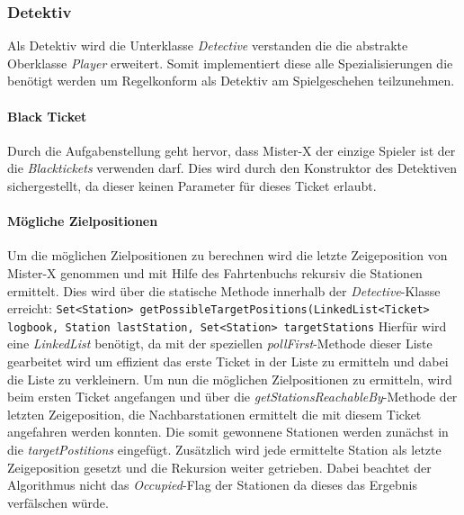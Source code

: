             \subsubsection{Detektiv}

                Als Detektiv wird die Unterklasse \textit{Detective} verstanden die die abstrakte Oberklasse \textit{Player} erweitert.
                Somit implementiert diese alle Spezialisierungen die benötigt werden um Regelkonform als Detektiv am Spielgeschehen teilzunehmen.

                \paragraph{Black Ticket}
                    Durch die Aufgabenstellung geht hervor, dass Mister-X der einzige Spieler ist der die \textit{Blacktickets}
                    verwenden darf. Dies wird durch den Konstruktor des Detektiven sichergestellt, da
                    dieser  keinen Parameter für dieses Ticket erlaubt.

                \paragraph{Mögliche Zielpositionen}
                    Um die möglichen Zielpositionen zu berechnen wird die letzte Zeigeposition von Mister-X genommen
                    und mit Hilfe des Fahrtenbuchs rekursiv die Stationen ermittelt.
                    Dies wird über die statische Methode innerhalb der \textit{Detective}-Klasse erreicht:
                    \newline
                    \newline
                    \texttt{Set<Station> getPossibleTargetPositions(LinkedList<Ticket> logbook,
                    Station lastStation, Set<Station> targetStations}
                    \newline
                    \newline
                    Hierfür wird eine \textit{LinkedList} benötigt, da mit der speziellen \textit{pollFirst}-Methode dieser Liste
                    gearbeitet wird um effizient das erste Ticket in der Liste zu ermitteln und dabei die Liste zu verkleinern.
                    \newline
                    Um nun die möglichen Zielpositionen zu ermitteln, wird beim ersten Ticket angefangen und über die \textit{getStationsReachableBy}-Methode der
                    letzten Zeigeposition, die Nachbarstationen ermittelt die mit diesem Ticket angefahren werden konnten.
                    Die somit gewonnene Stationen werden zunächst in die \textit{targetPostitions} eingefügt.
                    Zusätzlich wird jede ermittelte Station als letzte Zeigeposition gesetzt und die Rekursion weiter getrieben.
                    Dabei beachtet der Algorithmus nicht das \textit{Occupied}-Flag der Stationen
                    da dieses das Ergebnis verfälschen würde.

